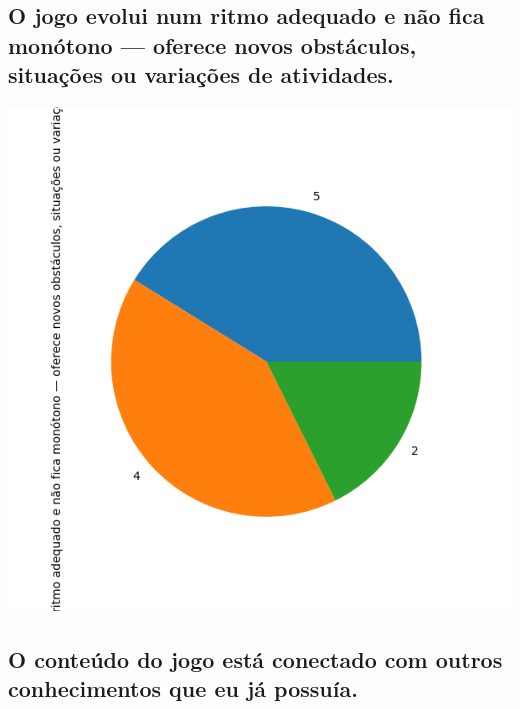\documentclass[12pt]{article}
\begin{document}
\subsection{O jogo evolui num ritmo adequado e não fica monótono — oferece novos obstáculos, situações ou variações de atividades.}

\begin{center}
  \includegraphics[scale=0.4]{O jogo evolui num ritmo adequado e não fica monótono — oferece novos obstáculos, situações ou variações de atividades..png}
\end{center}


\subsection{O conteúdo do jogo está conectado com outros conhecimentos que eu já possuía.}
\end{document}
